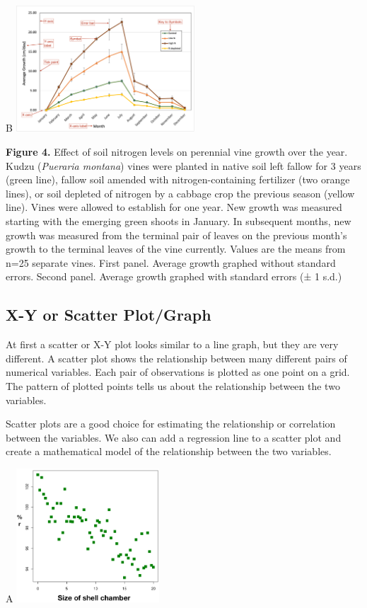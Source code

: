 \documentclass[
]{book}
\begin{document}
B
\includegraphics[width=0.5\textwidth,height=\textheight]{images/Line-plusSD.png}

\textbf{Figure 4.} Effect of soil nitrogen levels on perennial vine growth over the year. Kudzu (\emph{Pueraria montana}) vines were planted in native soil left fallow for 3 years (green line), fallow soil amended with nitrogen-containing fertilizer (two orange lines), or soil depleted of nitrogen by a cabbage crop the previous season (yellow line). Vines were allowed to establish for one year. New growth was measured starting with the emerging green shoots in January. In subsequent months, new growth was measured from the terminal pair of leaves on the previous month's growth to the terminal leaves of the vine currently. Values are the means from n=25 separate vines. First panel. Average growth graphed without standard errors. Second panel. Average growth graphed with standard errors (± 1 s.d.)

\hypertarget{x-y-or-scatter-plotgraph}{%
\subsection{X-Y or Scatter Plot/Graph}\label{x-y-or-scatter-plotgraph}}

At first a scatter or X-Y plot looks similar to a line graph, but they are very different. A scatter plot shows the relationship between many different pairs of numerical variables. Each pair of observations is plotted as one point on a grid. The pattern of plotted points tells us about the relationship between the two variables.

Scatter plots are a good choice for estimating the relationship or correlation between the variables. We also can add a regression line to a scatter plot and create a mathematical model of the relationship between the two variables.

A
\includegraphics[width=0.4\textwidth,height=\textheight]{images/Scatter_diagram.png}
\end{document}
